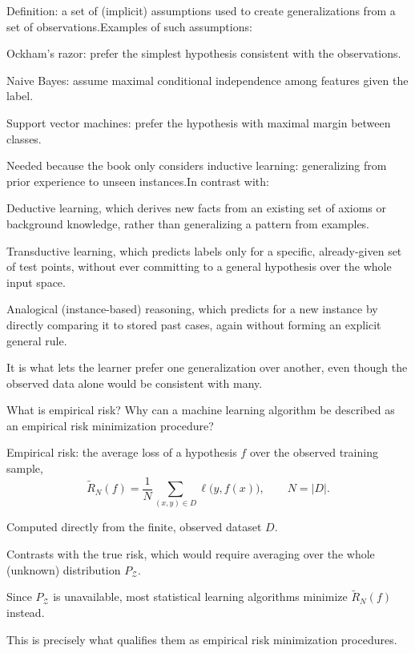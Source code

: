 \documentclass[10pt]{extarticle}
\newcommand{\resposta}[1]{\par\smallskip\noindent #1}
\begin{document}
\begin{questoes}
\resposta{
\begin{topicos}
\item Definition: a set of (implicit) assumptions used to create generalizations from a set of observations.Examples of such assumptions:
  \begin{topicos}
  \item Ockham's razor: prefer the simplest hypothesis consistent with the observations.
  \item Naive Bayes: assume maximal conditional independence among features given the label.
  \item Support vector machines: prefer the hypothesis with maximal margin between classes.
  \end{topicos}
\item Needed because the book only considers inductive learning: generalizing from prior experience to unseen instances.In contrast with:
  \begin{topicos}
  \item Deductive learning, which derives new facts from an existing set of axioms or background knowledge, rather than generalizing a pattern from examples.
  \item Transductive learning, which predicts labels only for a specific, already-given set of test points, without ever committing to a general hypothesis over the whole input space.
  \item Analogical (instance-based) reasoning, which predicts for a new instance by directly comparing it to stored past cases, again without forming an explicit general rule.
  \end{topicos}
\item It is what lets the learner prefer one generalization over another, even though the observed data alone would be consistent with many.
\end{topicos}
}

\item What is empirical risk? Why can a machine learning algorithm be described as an empirical risk minimization procedure?

\resposta{
\begin{topicos}
\item Empirical risk: the average loss of a hypothesis $f$ over the observed training sample,
\[
\tilde{R}_N(f) = \frac{1}{N}\sum_{(x,y)\in D} \ell\big(y, f(x)\big), \qquad N = |D|.
\]
\item Computed directly from the finite, observed dataset $D$.
\item Contrasts with the true risk, which would require averaging over the whole (unknown) distribution $P_{\mathcal{Z}}$.
\item Since $P_{\mathcal{Z}}$ is unavailable, most statistical learning algorithms minimize $\tilde{R}_N(f)$ instead.
\item This is precisely what qualifies them as empirical risk minimization procedures.
\end{topicos}
}


\end{questoes}
\end{document}
